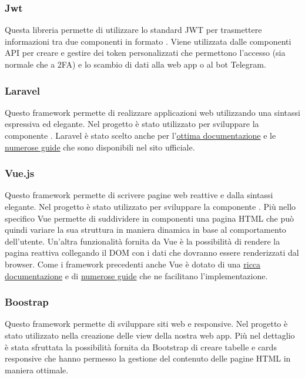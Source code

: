 		\subsubsection{Jwt}
			Questa libreria permette di utilizzare lo standard JWT per trasmettere informazioni tra due componenti in formato . Viene utilizzata dalle componenti API per creare e gestire dei token personalizzati che permettono l'accesso (sia normale che a 2FA) e lo scambio di dati alla web app o al bot Telegram.
		\subsubsection{Laravel}
			Questo framework permette di realizzare applicazioni web utilizzando una sintassi espressiva ed elegante. Nel progetto è stato utilizzato per sviluppare la componente . Laravel è stato scelto anche per l'\href{https://laravel.com/docs/7.x}{ottima documentazione} e le \href{https://laravel.com/docs/7.x/routing}{numerose guide} che sono disponibili nel sito ufficiale.
		\subsubsection{Vue.js}
			Questo framework permette di scrivere pagine web reattive e dalla sintassi elegante. Nel progetto è stato utilizzato per sviluppare la componente . Più nello specifico Vue permette di suddividere in componenti una pagina HTML che può quindi variare la sua struttura in maniera dinamica in base al comportamento dell'utente. Un'altra funzionalità fornita da Vue è la possibilità di rendere la pagina reattiva collegando il DOM con i dati che dovranno essere renderizzati dal browser.
			Come i framework precedenti anche Vue è dotato di una \href{https://vuejs.org/v2/api/}{ricca documentazione} e di \href{https://vuejs.org/v2/guide/index.html}{numerose guide} che ne facilitano l'implementazione. 
		\subsubsection{Boostrap}
			Questo framework permette di sviluppare siti web e  responsive. Nel progetto è stato utilizzato nella creazione delle view della nostra web app.
			Più nel dettaglio è stata sfruttata la possibilità fornita da Bootstrap di creare tabelle e cards responsive che hanno permesso la gestione del contenuto delle pagine HTML in maniera ottimale.	
